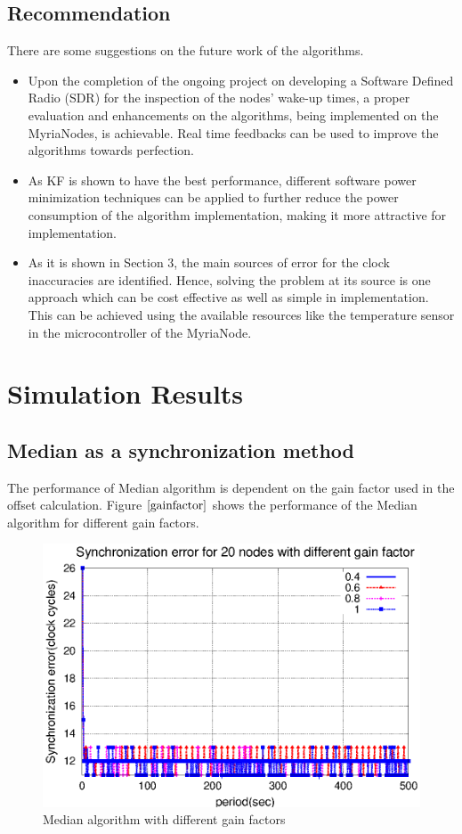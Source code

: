 \documentclass[a4paper,10pt]{report}
\begin{document}
\section{Recommendation}
There are some suggestions on the future work of the algorithms.
\begin{itemize}
 \item
Upon the completion of the ongoing project on developing a Software
Defined Radio (SDR) for the inspection of the nodes' wake-up times,
a proper evaluation and enhancements on the algorithms, being
implemented on the MyriaNodes, is achievable. Real time feedbacks
can be used to improve the algorithms towards perfection.
\item
As KF is shown to have the best performance, different software
power minimization techniques can be applied to further reduce the
power consumption of the algorithm implementation, making it more
attractive for implementation.
\item As it is shown in Section 3, the main
sources of error for the clock inaccuracies are identified. Hence,
solving the problem at its source is one approach which can be cost
effective as well as simple in implementation. This can be achieved
using the available resources like the temperature sensor in the
microcontroller of the MyriaNode.
\end{itemize}
\appendix
\chapter{Simulation Results}
\section{Median as a synchronization method}
The performance of Median algorithm is dependent on the gain factor used in the offset calculation. Figure $\ref{gainfactor}$ shows the performance of the Median algorithm for different gain factors.
\begin{figure}[!h]
\centering
\includegraphics[width= 0.7 \textwidth]{gainfactor}
\caption{Median algorithm with different gain factors} \label{gainfactor}
\end{figure}
\end{document}
